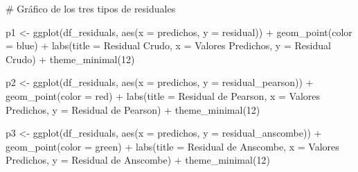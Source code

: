 \documentclass[
  letterpaper,
  DIV=11,
  numbers=noendperiod]{scrartcl}
\newenvironment{Shaded}{\begin{snugshade}}{\end{snugshade}}
\newcommand{\AttributeTok}[1]{\textcolor[rgb]{0.40,0.45,0.13}{#1}}
\newcommand{\CommentTok}[1]{\textcolor[rgb]{0.37,0.37,0.37}{#1}}
\newcommand{\DecValTok}[1]{\textcolor[rgb]{0.68,0.00,0.00}{#1}}
\newcommand{\FunctionTok}[1]{\textcolor[rgb]{0.28,0.35,0.67}{#1}}
\newcommand{\NormalTok}[1]{\textcolor[rgb]{0.00,0.23,0.31}{#1}}
\newcommand{\OtherTok}[1]{\textcolor[rgb]{0.00,0.23,0.31}{#1}}
\newcommand{\SpecialCharTok}[1]{\textcolor[rgb]{0.37,0.37,0.37}{#1}}
\newcommand{\StringTok}[1]{\textcolor[rgb]{0.13,0.47,0.30}{#1}}
\begin{document}
\begin{Shaded}
\begin{Highlighting}[]
\CommentTok{\# Gráfico de los tres tipos de residuales}

\NormalTok{p1 }\OtherTok{\textless{}{-}} \FunctionTok{ggplot}\NormalTok{(df\_residuals, }\FunctionTok{aes}\NormalTok{(}\AttributeTok{x =}\NormalTok{ predichos, }\AttributeTok{y =}\NormalTok{ residual)) }\SpecialCharTok{+}
    \FunctionTok{geom\_point}\NormalTok{(}\AttributeTok{color =} \StringTok{\textquotesingle{}blue\textquotesingle{}}\NormalTok{) }\SpecialCharTok{+}
    \FunctionTok{labs}\NormalTok{(}\AttributeTok{title =} \StringTok{\textquotesingle{}Residual Crudo\textquotesingle{}}\NormalTok{, }\AttributeTok{x =} \StringTok{\textquotesingle{}Valores Predichos\textquotesingle{}}\NormalTok{, }\AttributeTok{y =} \StringTok{\textquotesingle{}Residual Crudo\textquotesingle{}}\NormalTok{) }\SpecialCharTok{+}
    \FunctionTok{theme\_minimal}\NormalTok{(}\DecValTok{12}\NormalTok{)}

\NormalTok{p2 }\OtherTok{\textless{}{-}} \FunctionTok{ggplot}\NormalTok{(df\_residuals, }\FunctionTok{aes}\NormalTok{(}\AttributeTok{x =}\NormalTok{ predichos, }\AttributeTok{y =}\NormalTok{ residual\_pearson)) }\SpecialCharTok{+}
    \FunctionTok{geom\_point}\NormalTok{(}\AttributeTok{color =} \StringTok{\textquotesingle{}red\textquotesingle{}}\NormalTok{) }\SpecialCharTok{+}
    \FunctionTok{labs}\NormalTok{(}\AttributeTok{title =} \StringTok{\textquotesingle{}Residual de Pearson\textquotesingle{}}\NormalTok{, }\AttributeTok{x =} \StringTok{\textquotesingle{}Valores Predichos\textquotesingle{}}\NormalTok{, }\AttributeTok{y =} \StringTok{\textquotesingle{}Residual de Pearson\textquotesingle{}}\NormalTok{) }\SpecialCharTok{+}
    \FunctionTok{theme\_minimal}\NormalTok{(}\DecValTok{12}\NormalTok{)}

\NormalTok{p3 }\OtherTok{\textless{}{-}} \FunctionTok{ggplot}\NormalTok{(df\_residuals, }\FunctionTok{aes}\NormalTok{(}\AttributeTok{x =}\NormalTok{ predichos, }\AttributeTok{y =}\NormalTok{ residual\_anscombe)) }\SpecialCharTok{+}
    \FunctionTok{geom\_point}\NormalTok{(}\AttributeTok{color =} \StringTok{\textquotesingle{}green\textquotesingle{}}\NormalTok{) }\SpecialCharTok{+}
    \FunctionTok{labs}\NormalTok{(}\AttributeTok{title =} \StringTok{\textquotesingle{}Residual de Anscombe\textquotesingle{}}\NormalTok{, }\AttributeTok{x =} \StringTok{\textquotesingle{}Valores Predichos\textquotesingle{}}\NormalTok{, }\AttributeTok{y =} \StringTok{\textquotesingle{}Residual de Anscombe\textquotesingle{}}\NormalTok{) }\SpecialCharTok{+}
    \FunctionTok{theme\_minimal}\NormalTok{(}\DecValTok{12}\NormalTok{)}


\end{Highlighting}
\end{Shaded}
\end{document}
